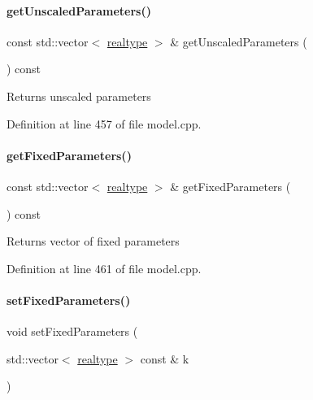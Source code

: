 \paragraph{\texorpdfstring{get\+Unscaled\+Parameters()}{getUnscaledParameters()}}
{\footnotesize\ttfamily const std\+::vector$<$ \mbox{\hyperlink{namespaceamici_a1bdce28051d6a53868f7ccbf5f2c14a3}{realtype}} $>$ \& get\+Unscaled\+Parameters (\begin{DoxyParamCaption}{ }\end{DoxyParamCaption}) const}

\begin{DoxyReturn}{Returns}
unscaled parameters 
\end{DoxyReturn}


Definition at line 457 of file model.\+cpp.

\mbox{\label{classamici_1_1_model_a76b24282a74eaca67d656149310dc07c}} 
\paragraph{\texorpdfstring{get\+Fixed\+Parameters()}{getFixedParameters()}}
{\footnotesize\ttfamily const std\+::vector$<$ \mbox{\hyperlink{namespaceamici_a1bdce28051d6a53868f7ccbf5f2c14a3}{realtype}} $>$ \& get\+Fixed\+Parameters (\begin{DoxyParamCaption}{ }\end{DoxyParamCaption}) const}

\begin{DoxyReturn}{Returns}
vector of fixed parameters 
\end{DoxyReturn}


Definition at line 461 of file model.\+cpp.

\mbox{\label{classamici_1_1_model_a14ba63ae81b4e8fa1f46884b703e2c30}} 
\paragraph{\texorpdfstring{set\+Fixed\+Parameters()}{setFixedParameters()}}
{\footnotesize\ttfamily void set\+Fixed\+Parameters (\begin{DoxyParamCaption}\item[{std\+::vector$<$ \mbox{\hyperlink{namespaceamici_a1bdce28051d6a53868f7ccbf5f2c14a3}{realtype}} $>$ const \&}]{k }\end{DoxyParamCaption})}


